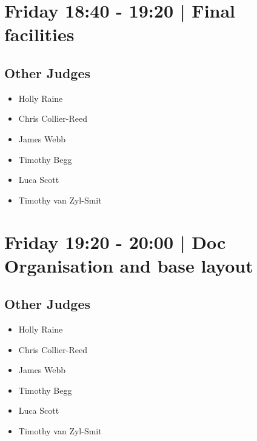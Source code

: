 \documentclass[10pt]{article}
\begin{document}
            \section*{Friday 18:40
        -
        19:20
        |
         Final facilities}
        
                
        \subsection*{Other Judges}
        
            \begin{itemize}
                            \item Holly Raine
                            \item Chris Collier-Reed
                            \item James Webb
                            \item Timothy Begg
                            \item Luca Scott
                            \item Timothy van Zyl-Smit
                        \end{itemize}
        

            \section*{Friday 19:20
        -
        20:00
        |
         Doc Organisation and base layout}
        
                
        \subsection*{Other Judges}
        
            \begin{itemize}
                            \item Holly Raine
                            \item Chris Collier-Reed
                            \item James Webb
                            \item Timothy Begg
                            \item Luca Scott
                            \item Timothy van Zyl-Smit
                        \end{itemize}
        
\end{document}
